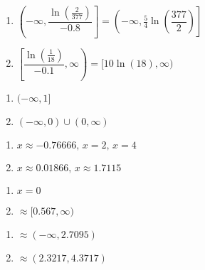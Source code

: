 \documentclass{ximera}
\begin{document}
\begin{multicols}{2} 
\begin{enumerate}
\setcounter{enumi}{\value{HW}}

\item $\left(-\infty, \dfrac{\ln\left(\frac{2}{377}\right)}{-0.8} \right] = \left(-\infty, \frac{5}{4}\ln\left(\dfrac{377}{2}\right) \right]$
\item $\left[\dfrac{\ln\left(\frac{1}{18}\right)}{-0.1}, \infty\right) = [10\ln(18), \infty)$

\setcounter{HW}{\value{enumi}}
\end{enumerate}
\end{multicols}


\begin{multicols}{2} 
\begin{enumerate}
\setcounter{enumi}{\value{HW}}

\item $(-\infty, 1]$
\item $(-\infty, 0) \cup (0, \infty)$


\setcounter{HW}{\value{enumi}}
\end{enumerate}
\end{multicols}

\begin{multicols}{2} 
\begin{enumerate}
\setcounter{enumi}{\value{HW}}

\item $x \approx -0.76666, \, x = 2, \, x = 4$
\item $x \approx 0.01866, \, x \approx 1.7115$


\setcounter{HW}{\value{enumi}}
\end{enumerate}
\end{multicols}

\begin{multicols}{2} 
\begin{enumerate}
\setcounter{enumi}{\value{HW}}

\item $x = 0$
\item $\approx [0.567, \infty)$

\setcounter{HW}{\value{enumi}}
\end{enumerate}
\end{multicols}

\begin{multicols}{2} 
\begin{enumerate}
\setcounter{enumi}{\value{HW}}

\item $\approx (-\infty, 2.7095)$
\item $\approx (2.3217, 4.3717)$


\setcounter{HW}{\value{enumi}}
\end{enumerate}
\end{multicols}
\end{document}
